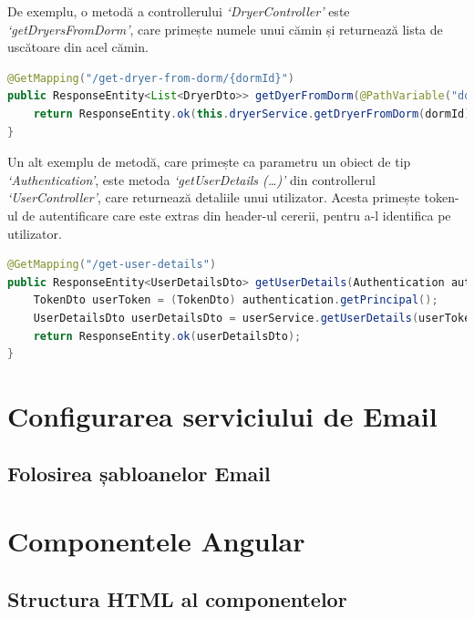 \documentclass[12pt,a4paper]{report}
\theoremstyle{definition}
\theoremstyle{remark}
\begin{document}
\par De exemplu, o metodă a controllerului \textit{`DryerController'} este \textit{`getDryersFromDorm'}, care primește numele unui cămin și returnează lista de uscătoare din acel cămin.

\begin{lstlisting}[language=Java, caption={Metoda getDryersFromDorm}]
@GetMapping("/get-dryer-from-dorm/{dormId}")
public ResponseEntity<List<DryerDto>> getDyerFromDorm(@PathVariable("dormId") String dormId) {
    return ResponseEntity.ok(this.dryerService.getDryerFromDorm(dormId));
}
\end{lstlisting}

\par Un alt exemplu de metodă, care primește ca parametru un obiect de tip \textit{`Authentication'}, este metoda \textit{`getUserDetails (\ldots)'} din controllerul \textit{`UserController'}, care returnează detaliile unui utilizator. Acesta primește token-ul de autentificare care este extras din header-ul cererii, pentru a-l identifica pe utilizator.

\begin{lstlisting}[language=Java, caption={Metoda getUserDetails(...)}]
@GetMapping("/get-user-details")
public ResponseEntity<UserDetailsDto> getUserDetails(Authentication authentication) {
    TokenDto userToken = (TokenDto) authentication.getPrincipal();
    UserDetailsDto userDetailsDto = userService.getUserDetails(userToken.getEmail());
    return ResponseEntity.ok(userDetailsDto);
}
\end{lstlisting}

\section{Configurarea serviciului de Email}

\subsection{Folosirea șabloanelor Email}

\newpage

\section{Componentele Angular}

\subsection{Structura HTML al componentelor}
\end{document}
